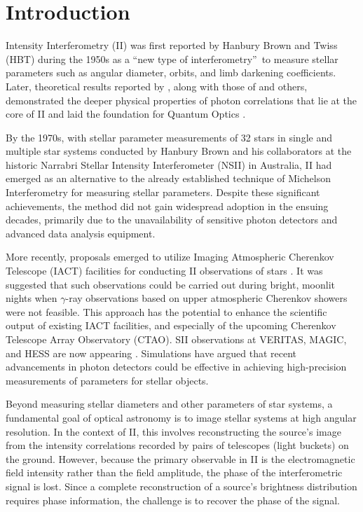 \section{Introduction}

Intensity Interferometry (II) was first reported by Hanbury Brown and Twiss (HBT) during the 1950s \citep{brown1954lxxiv, HBT56} as a \textquotedblleft new type of interferometry\textquotedblright\ to measure stellar parameters such as angular diameter, orbits, and limb darkening coefficients. Later, theoretical results reported by \cite{brown1957interferometry, brown1958interferometry}, along with those of \cite{glauber1963quantum} and others, demonstrated the deeper physical properties of photon correlations that lie at the core of II and laid the foundation for Quantum Optics \cite[for textbook treatments see][]{MandelWolf1995, Hecht2002}.

By the 1970s, with stellar parameter measurements of 32 stars in single and multiple star systems conducted by Hanbury Brown and his collaborators \citep{hanbury1974angular} at the historic Narrabri Stellar Intensity Interferometer (NSII) in Australia, II had emerged as an alternative to the already established technique of Michelson Interferometry for measuring stellar parameters. Despite these significant achievements, the method did not gain widespread adoption in the ensuing decades, primarily due to the unavailability of sensitive photon detectors and advanced data analysis equipment.

More recently, proposals emerged to utilize Imaging Atmospheric Cherenkov Telescope (IACT) facilities for conducting II observations of stars \citep{LeBohec2006, nunez2010stellar, nunez2012high, 2013APh....43..331D}. It was suggested that such observations could be carried out during bright, moonlit nights when $\gamma$-ray observations based on upper atmospheric Cherenkov showers were not feasible. This approach has the potential to enhance the scientific output of existing IACT facilities, and especially of the upcoming Cherenkov Telescope Array Observatory (CTAO).  SII observations at VERITAS, MAGIC, and HESS are now appearing \citep[e.g.,][]{2024ApJ...966...28A,2024MNRAS.529.4387A,2025MNRAS.537.2334V}. Simulations \citep[e.g.,][]{10.1093/mnras/stab2391, 10.1093/mnras/stac2433} have argued that recent advancements in photon detectors could be effective in achieving high-precision measurements of parameters for stellar objects. 

Beyond measuring stellar diameters and other parameters of star systems, a fundamental goal of optical astronomy is to image stellar systems at high angular resolution.  In the context of II, this involves reconstructing the source's image from the intensity correlations recorded by pairs of telescopes (light buckets) on the ground. However, because the primary observable in II is the electromagnetic field intensity rather than the field amplitude, the phase of the interferometric signal is lost. Since a complete reconstruction of a source's brightness distribution requires phase information, the challenge is to recover the phase of the signal.

